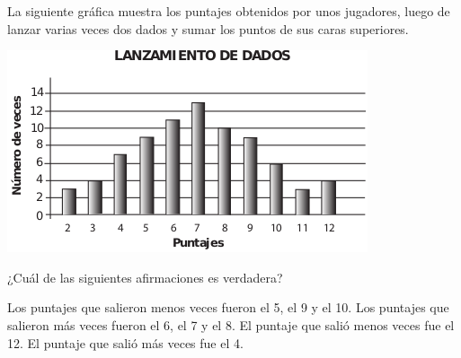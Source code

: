\documentclass[10pt,addpoints]{exam}
\begin{document}
\begin{multicols}{2}
\begin{questions}
\begin{oneparchoices}
\end{oneparchoices}
\question
La siguiente gráfica muestra los puntajes obtenidos por unos jugadores, luego de lanzar varias veces dos dados y sumar los puntos de sus caras superiores.
\begin{center}
\includegraphics[scale=.4]{Images/Pantallazo-16.png} 
\end{center}
¿Cuál de las siguientes afirmaciones es verdadera?
\begin{choices}
\choice Los puntajes que salieron menos veces fueron el 5, el 9 y el 10.
\CorrectChoice Los puntajes que salieron más veces fueron el 6, el 7 y el 8.
\choice El puntaje que salió menos veces fue el 12.
\choice El puntaje que salió más veces fue el 4.
\end{choices}
\end{questions}
\end{multicols}
\end{document}
